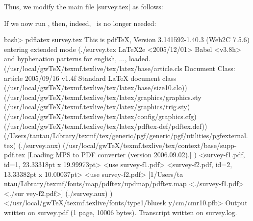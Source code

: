 Thus, we modify the main file |survey.tex| as follows:
%
%
If we now run , then, indeed, \pgfname\ is no longer needed:
%
\begin{codeexample}[code only,typeset listing/.code=#1]
bash> pdflatex survey.tex
This is pdfTeX, Version 3.141592-1.40.3 (Web2C 7.5.6)
entering extended mode
(./survey.tex
LaTeX2e <2005/12/01>
Babel <v3.8h> and hyphenation patterns for english, ..., loaded.
(/usr/local/gwTeX/texmf.texlive/tex/latex/base/article.cls
Document Class: article 2005/09/16 v1.4f Standard LaTeX document class
(/usr/local/gwTeX/texmf.texlive/tex/latex/base/size10.clo))
(/usr/local/gwTeX/texmf.texlive/tex/latex/graphics/graphics.sty
(/usr/local/gwTeX/texmf.texlive/tex/latex/graphics/trig.sty)
(/usr/local/gwTeX/texmf.texlive/tex/latex/config/graphics.cfg)
(/usr/local/gwTeX/texmf.texlive/tex/latex/pdftex-def/pdftex.def))
(/Users/tantau/Library/texmf/tex/generic/pgf/generic/pgf/utilities/pgfexternal.
tex) (./survey.aux)
(/usr/local/gwTeX/texmf.texlive/tex/context/base/supp-pdf.tex
[Loading MPS to PDF converter (version 2006.09.02).]
) <survey-f1.pdf, id=1, 23.33318pt x 19.99973pt> <use survey-f1.pdf>
<survey-f2.pdf, id=2, 13.33382pt x 10.00037pt> <use survey-f2.pdf> [1{/Users/ta
ntau/Library/texmf/fonts/map/pdftex/updmap/pdftex.map} <./survey-f1.pdf> <./sur
vey-f2.pdf>] (./survey.aux) )</usr/local/gwTeX/texmf.texlive/fonts/type1/bluesk
y/cm/cmr10.pfb>
Output written on survey.pdf (1 page, 10006 bytes).
Transcript written on survey.log.
\end{codeexample}

